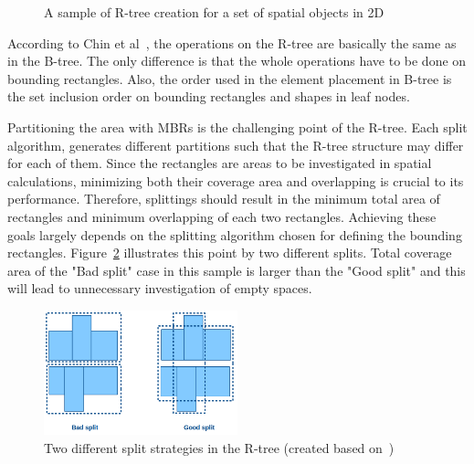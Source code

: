 \documentclass[a4paper,12pt]{article}
\begin{document}
\begin{figure}
\centering
{}
\centering
{}
\caption{A sample of R-tree creation for a set of spatial objects in 2D}
\label{rtree}
\end{figure}

According to Chin et al~\cite{survey}, the operations on the R-tree 
are basically the same as in the B-tree. The only difference is that the 
whole operations have to be done on bounding rectangles.
Also, the order used in the element placement in B-tree
is the set inclusion order on bounding rectangles and shapes in leaf nodes. 

Partitioning the area with MBRs is the challenging point of the R-tree. Each split algorithm, generates different partitions such that the R-tree structure may differ for each of them. Since the rectangles are areas to be investigated in spatial calculations, minimizing both their coverage area and overlapping is crucial to its performance. Therefore, splittings should result in the minimum total area of rectangles and minimum overlapping of each two rectangles. 
Achieving these goals largely depends on the splitting algorithm chosen for defining the bounding rectangles. Figure~\ref{rtreesplit} illustrates this point by two different splits. Total coverage area of the "Bad split" case in this sample is larger than the "Good split" and this will lead to unnecessary investigation of empty spaces.

\begin{figure}
\centering
\includegraphics[width=0.5\textwidth,height=0.17\textheight]{R-treeMBR}
\caption{Two different split strategies in the R-tree (created based on~\cite{rtree})}
\label{rtreesplit}
\end{figure}
\end{document}

